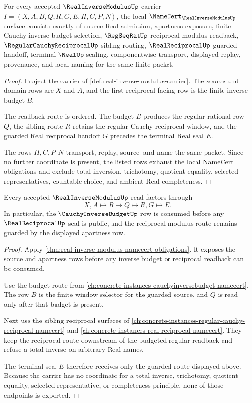 \begin{theorem}
\label{thm:real-inverse-modulus-namecert-obligations}
For every accepted $\RealInverseModulusUp$ carrier $I=(X,A,B,Q,R,G,E,H,C,P,N)$, the local $\NameCert_{\RealInverseModulusUp}$ surface consists exactly of source Real admission, apartness exposure, finite Cauchy inverse budget selection, $\RegSeqRatUp$ reciprocal-modulus readback, $\RegularCauchyReciprocalUp$ sibling routing, $\RealReciprocalUp$ guarded handoff, terminal $\RealUp$ sealing, componentwise transport, displayed replay, provenance, and local naming for the same finite packet.
\end{theorem}
\begin{proof}
Project the carrier of \autoref{def:real-inverse-modulus-carrier}. The source and domain rows are $X$ and $A$, and the first reciprocal-facing row is the finite inverse budget $B$.

The readback route is ordered. The budget $B$ produces the regular rational row $Q$, the sibling route $R$ retains the regular-Cauchy reciprocal window, and the guarded Real reciprocal handoff $G$ precedes the terminal Real seal $E$.

The rows $H,C,P,N$ transport, replay, source, and name the same packet. Since no further coordinate is present, the listed rows exhaust the local NameCert obligations and exclude total inversion, trichotomy, quotient equality, selected representatives, countable choice, and ambient Real completeness.
\end{proof}

\begin{theorem}
\label{thm:real-inverse-modulus-cauchy-inverse-budget-handoff}
Every accepted $\RealInverseModulusUp$ read factors through
$$
X,A \longmapsto B \longmapsto Q \longmapsto R,G \longmapsto E .
$$
In particular, the $\CauchyInverseBudgetUp$ row is consumed before any $\RealReciprocalUp$ seal is public, and the reciprocal-modulus route remains guarded by the displayed apartness row.
\end{theorem}
\begin{proof}
Apply \autoref{thm:real-inverse-modulus-namecert-obligations}. It exposes the source and apartness rows before any inverse budget or reciprocal readback can be consumed.

Use the budget route from \autoref{ch:concrete-instances-cauchyinversebudget-namecert}. The row $B$ is the finite window selector for the guarded source, and $Q$ is read only after that budget is present.

Next use the sibling reciprocal surfaces of \autoref{ch:concrete-instances-regular-cauchy-reciprocal-namecert} and \autoref{ch:concrete-instances-real-reciprocal-namecert}. They keep the reciprocal route downstream of the budgeted regular readback and refuse a total inverse on arbitrary Real names.

The terminal seal $E$ therefore receives only the guarded route displayed above. Because the carrier has no coordinate for a total inverse, trichotomy, quotient equality, selected representative, or completeness principle, none of those endpoints is exported.
\end{proof}

